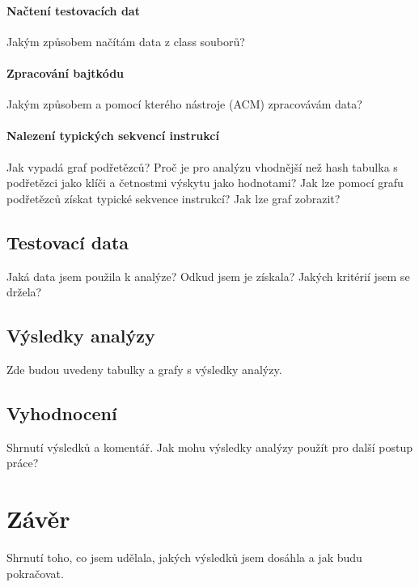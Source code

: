 \subsubsection{Načtení testovacích dat}

Jakým způsobem načítám data z class souborů?

\subsubsection{Zpracování bajtkódu}

Jakým způsobem a pomocí kterého nástroje (ACM) zpracovávám data?

\subsubsection{Nalezení typických sekvencí instrukcí}

Jak vypadá graf podřetězců? Proč je pro analýzu vhodnější než hash tabulka s podřetězci jako klíči a četnostmi výskytu jako hodnotami?
Jak lze pomocí grafu podřetězců získat typické sekvence instrukcí? Jak lze graf zobrazit?

\section{Testovací data}

Jaká data jsem použila k analýze? Odkud jsem je získala? Jakých kritérií jsem se držela?

\section{Výsledky analýzy}

Zde budou uvedeny tabulky a grafy s výsledky analýzy.

\section{Vyhodnocení}

Shrnutí výsledků a komentář. Jak mohu výsledky analýzy použít pro další postup práce?


\chapter{Závěr}

Shrnutí toho, co jsem udělala, jakých výsledků jsem dosáhla a jak budu pokračovat.

